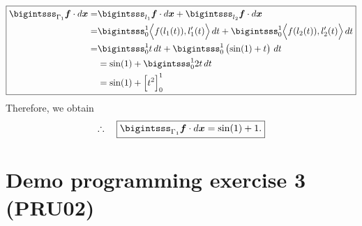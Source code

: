 \documentclass[12pt]{article}
\begin{document}
\begin{align*}
	\boxed{
		\begin{aligned}
			\bigintsss_{\Gamma_1} \Bf \cdot d\Bx
			= & \bigintsss_{l_1} \Bf \cdot d\Bx 
			+ \bigintsss_{l_2} \Bf \cdot d\Bx                                    \\
			= & \bigintsss_0^1 \Big\langle f(l_1(t)), l_1'(t) \Big\rangle \, dt 
			+ \bigintsss_0^1 \Big\langle f(l_2(t)), l_2'(t) \Big\rangle \, dt    \\
			= & \bigintsss_0^1 t  \, dt
			+ \bigintsss_0^1 \left( \sin(1) + t \right) \,  dt                   \\
			  & =  \sin(1) + \bigintsss_0^1 2t  \, dt                            \\
			  & =  \sin(1) + \Big[ t^2 \Big]_0^1
		\end{aligned}
	}
\end{align*}
Therefore, we obtain
\begin{align*}
	\therefore\quad\boxed{
		\bigintsss_{\Gamma_1} \Bf \cdot d\Bx =  \sin(1) + 1.
	}
\end{align*}
\clearpage
\section{Demo programming exercise 3 (PRU02)}



% 
\end{document}
